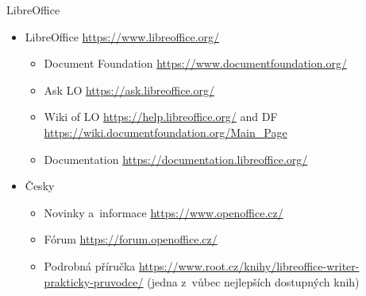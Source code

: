 \documentclass[compress, ucs, xelatex, 11pt, xcolor=svgnames, aspectratio=169,
	hyperref={
		bookmarks=true,
		unicode=true,
		colorlinks=true,
		pdftitle={Linux, command line and MetaCentrum},
		plainpages=false,
		pdfauthor={Vojtech Zeisek},
		pdfsubject={Course about use of Linux command line, writing shell scripts and using MetaCentrum of CESNET},
		pdfcreator={XeLaTeX},
		pdfkeywords={Linux, GNU, BASH, shell, command line, MetaCentrum},
		linkcolor=DarkRed, %
		anchorcolor=DarkBlue, %
		citecolor=Indigo, %
		filecolor=NavyBlue, %
		menucolor=DarkMagenta, %
		urlcolor=DarkBlue, %
		pdftex},
	url={hyphens, lowtilde} %
	]{beamer}
\begin{document}
\begin{frame}{LibreOffice}
	\begin{itemize}
		\item LibreOffice \url{https://www.libreoffice.org/}
		\begin{itemize}
			\item Document Foundation \url{https://www.documentfoundation.org/}
			\item Ask LO \url{https://ask.libreoffice.org/}
			\item Wiki of LO \url{https://help.libreoffice.org/} and DF \url{https://wiki.documentfoundation.org/Main_Page}
			\item Documentation \url{https://documentation.libreoffice.org/}
		\end{itemize}
		\item Česky
		\begin{itemize}
			\item Novinky a~informace \url{https://www.openoffice.cz/}
			\item Fórum \url{https://forum.openoffice.cz/}
			\item Podrobná příručka \url{https://www.root.cz/knihy/libreoffice-writer-prakticky-pruvodce/} (jedna z~vůbec nejlepších dostupných knih)
		\end{itemize}
	\end{itemize}
\end{frame}
\end{document}
